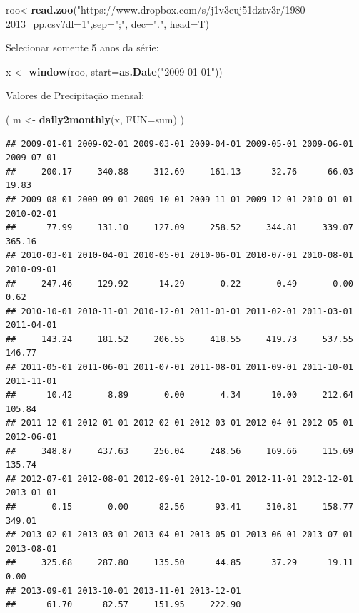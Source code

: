 \documentclass[
]{book}
\newenvironment{Shaded}{\begin{snugshade}}{\end{snugshade}}
\newcommand{\DataTypeTok}[1]{\textcolor[rgb]{0.13,0.29,0.53}{#1}}
\newcommand{\KeywordTok}[1]{\textcolor[rgb]{0.13,0.29,0.53}{\textbf{#1}}}
\newcommand{\NormalTok}[1]{#1}
\newcommand{\StringTok}[1]{\textcolor[rgb]{0.31,0.60,0.02}{#1}}
\begin{document}
\begin{Shaded}
\begin{Highlighting}[]
\NormalTok{roo<-}\KeywordTok{read.zoo}\NormalTok{(}\StringTok{"https://www.dropbox.com/s/j1v3euj51dztv3r/1980-2013_pp.csv?dl=1"}\NormalTok{,}\DataTypeTok{sep=}\StringTok{";"}\NormalTok{, }\DataTypeTok{dec=}\StringTok{"."}\NormalTok{, }\DataTypeTok{head=}\NormalTok{T)}
\end{Highlighting}
\end{Shaded}

Selecionar somente 5 anos da série:

\begin{Shaded}
\begin{Highlighting}[]
\NormalTok{x <-}\StringTok{ }\KeywordTok{window}\NormalTok{(roo, }\DataTypeTok{start=}\KeywordTok{as.Date}\NormalTok{(}\StringTok{"2009-01-01"}\NormalTok{))}
\end{Highlighting}
\end{Shaded}

Valores de Precipitação mensal:

\begin{Shaded}
\begin{Highlighting}[]
\NormalTok{( m <-}\StringTok{ }\KeywordTok{daily2monthly}\NormalTok{(x, }\DataTypeTok{FUN=}\NormalTok{sum) )}
\end{Highlighting}
\end{Shaded}

\begin{verbatim}
## 2009-01-01 2009-02-01 2009-03-01 2009-04-01 2009-05-01 2009-06-01 2009-07-01 
##     200.17     340.88     312.69     161.13      32.76      66.03      19.83 
## 2009-08-01 2009-09-01 2009-10-01 2009-11-01 2009-12-01 2010-01-01 2010-02-01 
##      77.99     131.10     127.09     258.52     344.81     339.07     365.16 
## 2010-03-01 2010-04-01 2010-05-01 2010-06-01 2010-07-01 2010-08-01 2010-09-01 
##     247.46     129.92      14.29       0.22       0.49       0.00       0.62 
## 2010-10-01 2010-11-01 2010-12-01 2011-01-01 2011-02-01 2011-03-01 2011-04-01 
##     143.24     181.52     206.55     418.55     419.73     537.55     146.77 
## 2011-05-01 2011-06-01 2011-07-01 2011-08-01 2011-09-01 2011-10-01 2011-11-01 
##      10.42       8.89       0.00       4.34      10.00     212.64     105.84 
## 2011-12-01 2012-01-01 2012-02-01 2012-03-01 2012-04-01 2012-05-01 2012-06-01 
##     348.87     437.63     256.04     248.56     169.66     115.69     135.74 
## 2012-07-01 2012-08-01 2012-09-01 2012-10-01 2012-11-01 2012-12-01 2013-01-01 
##       0.15       0.00      82.56      93.41     310.81     158.77     349.01 
## 2013-02-01 2013-03-01 2013-04-01 2013-05-01 2013-06-01 2013-07-01 2013-08-01 
##     325.68     287.80     135.50      44.85      37.29      19.11       0.00 
## 2013-09-01 2013-10-01 2013-11-01 2013-12-01 
##      61.70      82.57     151.95     222.90
\end{verbatim}
\end{document}
